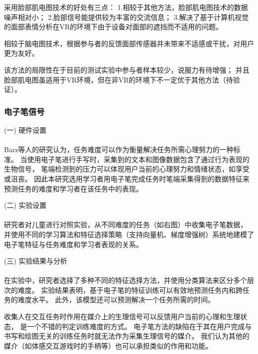 \documentclass{article}
\begin{document}
            采用脸部肌电图技术的好处有三点：
            1.相较于其他方法，脸部肌电图技术的数据噪声相对小；
            2.脸部信号能提供较为丰富的交流信息；
            3.解决了基于计算机视觉的面部表情分析在VR的环境下由于设备对面部的遮挡而不适用的问题。

            相较于脑电图技术，根据参与者的反馈面部传感器并未带来不适感或干扰，对用户更为友好。

            该方法的局限性在于目前的测试实验中参与者样本较少，说服力有待增强；
            并且脸部肌电图虽适用于VR环境，但在非VR的环境下不一定优于其他方法（待验证）。

            \subsubsection{电子笔信号}
            (一) 硬件设置\paragraph{}
            Barz等人的研究认为，任务难度可以作为衡量解决任务所需心理努力的一种标准。
            当使用电子笔进行手写时，采集到的文本和图像数据包含了通过行为表现的生物信号，
            笔端检测到的压力可以体现用户当前的心理努力和情绪状态，如享受或沮丧。
            因此本研究选用学习者用电子笔完成任务时笔端采集得到的数据特征来预测任务的难度和学习者在该任务中的表现。

            (二) 实验设置\paragraph{}
            研究者对儿童进行对照实验，从不同难度的任务（如右图）中收集电子笔数据，
            并使用不同的学习算法和特征选择策略（支持向量机、梯度增强树）系统地建模了电子笔特征与任务难度和学习者表现的关系。

            (三) 实验结果与分析\paragraph{}
            在实验中，研究者选择了多种不同的特征选择方法，并使用分类算法来区分多个层次的难度。
            实验结果表明，基于电子笔的特征训练可以有效地预测任务内和跨任务的难度水平。
            此外，该模型还可以预测解决一个任务所需的时间。

            收集人在交互任务时作用在媒介上的生理信号可以反馈用户当前的心理和生理状态，
            是一个不错的判定训练难度的方式。
            电子笔方法的缺陷在于其在用户完成与书写和绘图无关的训练任务时就无法作为采集生理信号的媒介。
            我们认为其他的媒介（如体感交互游戏时的手柄等）也可以承担类似的作用和功能。
\end{document}
